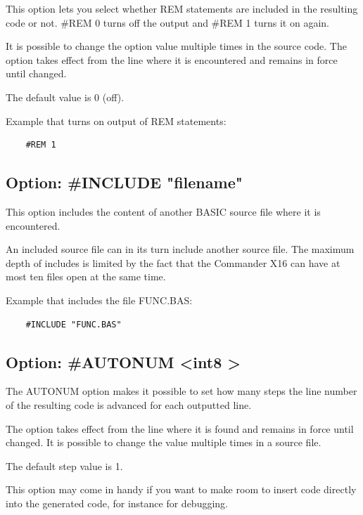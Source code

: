 \documentclass{article}
\begin{document}
        This option lets you select whether REM statements are included in
        the resulting code or not. \#REM 0 turns off the output and \#REM 1
        turns it on again.

        It is possible to change the option value multiple times in the
        source code. The option takes effect from the line where it is 
        encountered and remains in force until changed.

        The default value is 0 (off).

        Example that turns on output of REM statements:
        \begin{verbatim}
    #REM 1
        \end{verbatim}

    \subsection{Option: \#INCLUDE "filename"}

        This option includes the content of another BASIC source
        file where it is encountered.

        An included source file can in its turn include another
        source file. The maximum depth of includes is limited
        by the fact that the Commander X16 can have at most
        ten files open at the same time.

        Example that includes the file FUNC.BAS:
        \begin{verbatim}
    #INCLUDE "FUNC.BAS"
        \end{verbatim}    

    \subsection{Option: \#AUTONUM \textless int8 \textgreater }

        The AUTONUM option makes it possible to set how many
        steps the line number of the resulting code is
        advanced for each outputted line.

        The option takes effect from the line where it is
        found and remains in force until changed. It is
        possible to change the value multiple times in a
        source file.

        The default step value is 1.

        This option may come in handy if you want to make
        room to insert code directly into the generated code,
        for instance for debugging.
        
\end{document}
